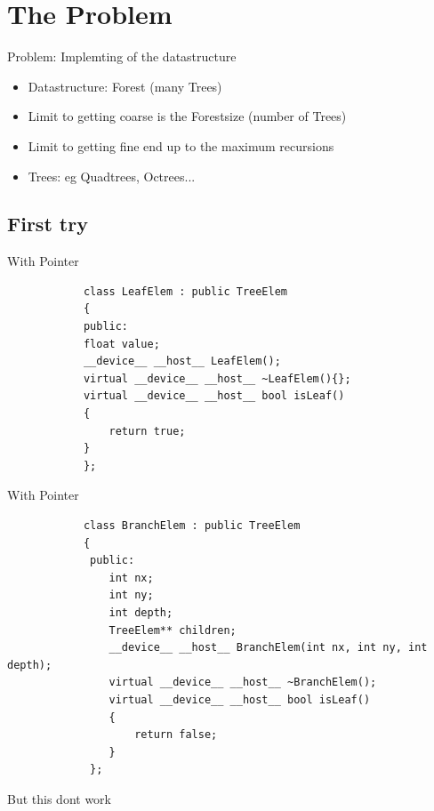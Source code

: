 \documentclass[fleqn,11pt,aspectratio=43]{beamer}
\begin{document}
\section{The Problem}
	\begin{frame}{Problem: Implemting of the datastructure}
		\begin{itemize}
			\item Datastructure: Forest (many Trees)
			\item Limit to getting coarse is the Forestsize (number of Trees)
			\item Limit to getting fine end up to the maximum recursions
			\item Trees: eg Quadtrees, Octrees...
		\end{itemize}		
	\end{frame}
\subsection{First try}

\begin{frame}[fragile]{With Pointer}
	\begin{verbatim}
			class LeafElem : public TreeElem
			{
			public:
  			float value;
  			__device__ __host__ LeafElem();
  			virtual __device__ __host__ ~LeafElem(){};
  			virtual __device__ __host__ bool isLeaf()
  			{
    			return true;
  			}
			};
	\end{verbatim}
\end{frame}

\begin{frame}[fragile]{With Pointer}
	\begin{verbatim}
			class BranchElem : public TreeElem
			{
			 public:
			    int nx;
			    int ny;
			    int depth;
			    TreeElem** children;
			    __device__ __host__ BranchElem(int nx, int ny, int depth);
			    virtual __device__ __host__ ~BranchElem();
			    virtual __device__ __host__ bool isLeaf()
			    {
			        return false;
			    }
			 };
	\end{verbatim}
\end{frame}

\begin{frame}{But this dont work}
\end{frame}
\end{document}
